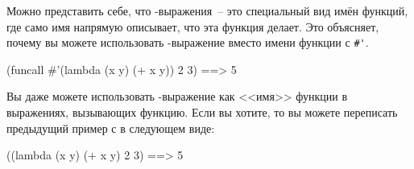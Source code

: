 Можно представить себе, что -выражения~-- это специальный вид имён функций,
где само имя напрямую описывает, что эта функция делает.  Это объясняет, почему вы можете
использовать -выражение вместо имени функции с \lstinline!#'!.

\begin{myverb}
  (funcall #'(lambda (x y) (+ x y)) 2 3) ==> 5
\end{myverb}

Вы даже можете использовать -выражение как <<имя>> функции в выражениях,
вызывающих функцию.  Если вы хотите, то вы можете переписать предыдущий пример с
 в следующем виде:

\begin{myverb}
  ((lambda (x y) (+ x y) 2 3) ==> 5
\end{myverb}

